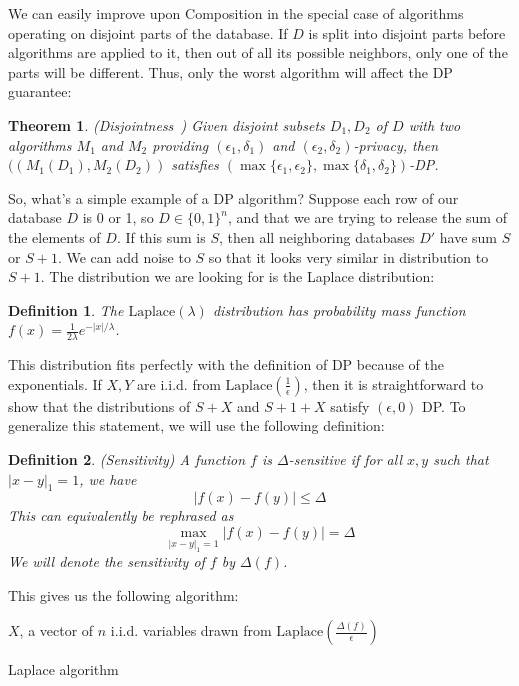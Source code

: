 \documentclass[11pt]{report}
\newtheorem{theorem}{Theorem}
\newtheorem{defn}{Definition}
\begin{document}
We can easily improve upon Composition in the special case of algorithms operating on disjoint parts of the database. If $D$ is split into disjoint parts before algorithms are applied to it, then out of all its possible neighbors, only one of the parts will be different. Thus, only the worst algorithm will affect the DP guarantee:
\begin{theorem}\label{thm:disj}
(Disjointness~\cite{Dwork:2006}) Given disjoint subsets $D_1, D_2$ of $D$ with two algorithms $M_1$ and $M_2$ providing $(\epsilon_1, \delta_1)$ and $(\epsilon_2, \delta_2)$-privacy, then $((M_1(D_1), M_2(D_2))$ satisfies $(\max\{\epsilon_1, \epsilon_2\}, \max\{\delta_1, \delta_2\})$-DP.
\end{theorem}

So, what's a simple example of a DP algorithm? Suppose each row of our database $D$ is 0 or 1, so $D \in \{0, 1\}^n$, and that we are trying to release the sum of the elements of $D$. If this sum is $S$, then all neighboring databases $D'$ have sum $S$ or $S+1$. We can add noise to $S$ so that it looks very similar in distribution to $S+1$. The distribution we are looking for is the Laplace distribution:
\begin{defn}
The $\text{Laplace}(\lambda)$ distribution has probability mass function $f(x) = \frac{1}{2\lambda}e^{-|x|/\lambda}$.
\end{defn}
This distribution fits perfectly with the definition of DP because of the exponentials. If $X,Y$ are i.i.d. from $\text{Laplace}\left(\frac{1}{\epsilon}\right)$, then it is straightforward to show that the distributions of $S+X$ and $S+1+X$ satisfy $(\epsilon, 0)$ DP. To generalize this statement, we will use the following definition:
\begin{defn}
(Sensitivity) A function $f$ is $\Delta$-sensitive if for all $x,y$ such that $|x-y|_1 = 1$, we have 
\[
|f(x) - f(y)| \leq \Delta
\]
This can equivalently be rephrased as 
\[
\max_{|x-y|_1=1}|f(x) - f(y)| = \Delta
\]
We will denote the sensitivity of $f$ by $\Delta(f)$.
\end{defn}
This gives us the following algorithm:

\begin{algorithm}\label{alg:1}
\SetAlgoLined
{}
$X$, a vector of $n$ i.i.d. variables drawn from $\text{Laplace}\left(\frac{\Delta(f)}{\epsilon}\right)$\;
\caption{Laplace algorithm}
\end{algorithm}
\end{document}
